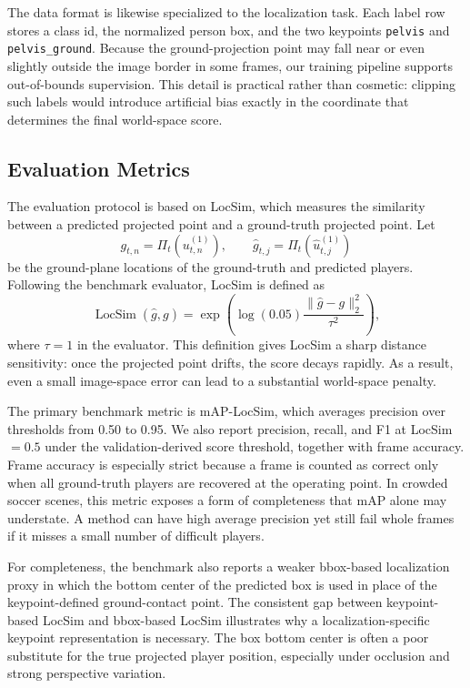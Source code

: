 \documentclass[runningheads]{llncs}
\begin{document}
The data format is likewise specialized to the localization task. Each label row stores a class id, the normalized person box, and the two keypoints \texttt{pelvis} and \texttt{pelvis\_ground}. Because the ground-projection point may fall near or even slightly outside the image border in some frames, our training pipeline supports out-of-bounds supervision. This detail is practical rather than cosmetic: clipping such labels would introduce artificial bias exactly in the coordinate that determines the final world-space score.

\subsection{Evaluation Metrics}
\label{sec:evaluation-metrics}

The evaluation protocol is based on LocSim, which measures the similarity between a predicted projected point and a ground-truth projected point. Let
\[
g_{t,n}=\Pi_t\!\left(u_{t,n}^{(1)}\right), \qquad \hat{g}_{t,j}=\Pi_t\!\left(\hat{u}_{t,j}^{(1)}\right)
\]
be the ground-plane locations of the ground-truth and predicted players. Following the benchmark evaluator, LocSim is defined as
\begin{equation}
\operatorname{LocSim}(\hat{g},g)=\exp\!\left(\log(0.05)\frac{\|\hat{g}-g\|_2^2}{\tau^2}\right),
\label{eq:locsim}
\end{equation}
where $\tau=1$ in the evaluator. This definition gives LocSim a sharp distance sensitivity: once the projected point drifts, the score decays rapidly. As a result, even a small image-space error can lead to a substantial world-space penalty.

The primary benchmark metric is mAP-LocSim, which averages precision over thresholds from 0.50 to 0.95. We also report precision, recall, and F1 at LocSim$=0.5$ under the validation-derived score threshold, together with frame accuracy. Frame accuracy is especially strict because a frame is counted as correct only when all ground-truth players are recovered at the operating point. In crowded soccer scenes, this metric exposes a form of completeness that mAP alone may understate. A method can have high average precision yet still fail whole frames if it misses a small number of difficult players.

For completeness, the benchmark also reports a weaker bbox-based localization proxy in which the bottom center of the predicted box is used in place of the keypoint-defined ground-contact point. The consistent gap between keypoint-based LocSim and bbox-based LocSim illustrates why a localization-specific keypoint representation is necessary. The box bottom center is often a poor substitute for the true projected player position, especially under occlusion and strong perspective variation.
\end{document}
